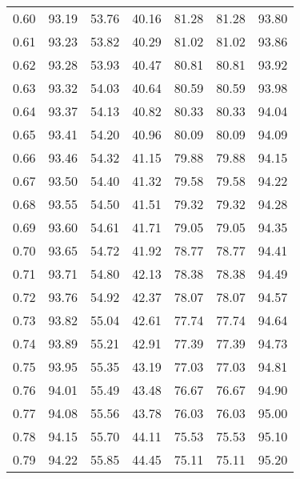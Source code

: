 \begin{tabular}{|c|c|c|c|c|c|c|}
      0.60 &     93.19 &     53.76 &      40.16 &   81.28 &      81.28 &         93.80 \\
      0.61 &     93.23 &     53.82 &      40.29 &   81.02 &      81.02 &         93.86 \\
      0.62 &     93.28 &     53.93 &      40.47 &   80.81 &      80.81 &         93.92 \\
      0.63 &     93.32 &     54.03 &      40.64 &   80.59 &      80.59 &         93.98 \\
      0.64 &     93.37 &     54.13 &      40.82 &   80.33 &      80.33 &         94.04 \\
      0.65 &     93.41 &     54.20 &      40.96 &   80.09 &      80.09 &         94.09 \\
      0.66 &     93.46 &     54.32 &      41.15 &   79.88 &      79.88 &         94.15 \\
      0.67 &     93.50 &     54.40 &      41.32 &   79.58 &      79.58 &         94.22 \\
      0.68 &     93.55 &     54.50 &      41.51 &   79.32 &      79.32 &         94.28 \\
      0.69 &     93.60 &     54.61 &      41.71 &   79.05 &      79.05 &         94.35 \\
      0.70 &     93.65 &     54.72 &      41.92 &   78.77 &      78.77 &         94.41 \\
      0.71 &     93.71 &     54.80 &      42.13 &   78.38 &      78.38 &         94.49 \\
      0.72 &     93.76 &     54.92 &      42.37 &   78.07 &      78.07 &         94.57 \\
      0.73 &     93.82 &     55.04 &      42.61 &   77.74 &      77.74 &         94.64 \\
      0.74 &     93.89 &     55.21 &      42.91 &   77.39 &      77.39 &         94.73 \\
      0.75 &     93.95 &     55.35 &      43.19 &   77.03 &      77.03 &         94.81 \\
      0.76 &     94.01 &     55.49 &      43.48 &   76.67 &      76.67 &         94.90 \\
      0.77 &     94.08 &     55.56 &      43.78 &   76.03 &      76.03 &         95.00 \\
      0.78 &     94.15 &     55.70 &      44.11 &   75.53 &      75.53 &         95.10 \\
      0.79 &     94.22 &     55.85 &      44.45 &   75.11 &      75.11 &         95.20 \\

\end{tabular}
